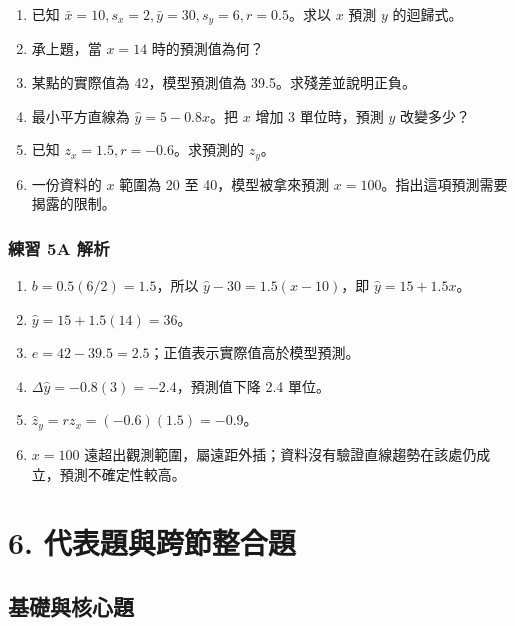 \documentclass[11pt,a4paper]{article}
\providecommand{\tightlist}{%
  \setlength{\itemsep}{0pt}\setlength{\parskip}{0pt}}
\begin{document}
\begin{enumerate}
\def\labelenumi{\arabic{enumi}.}
\tightlist
\item
  已知 \(\bar x=10,s_x=2,\bar y=30,s_y=6,r=0.5\)。求以 \(x\) 預測 \(y\) 的迴歸式。
\item
  承上題，當 \(x=14\) 時的預測值為何？
\item
  某點的實際值為 42，模型預測值為 39.5。求殘差並說明正負。
\item
  最小平方直線為 \(\hat y=5-0.8x\)。把 \(x\) 增加 3 單位時，預測 \(y\) 改變多少？
\item
  已知 \(z_x=1.5,r=-0.6\)。求預測的 \(z_y\)。
\item
  一份資料的 \(x\) 範圍為 20 至 40，模型被拿來預測 \(x=100\)。指出這項預測需要揭露的限制。
\end{enumerate}

\subsubsection{練習 5A 解析}\label{ux7df4ux7fd2-5a-ux89e3ux6790}

\begin{enumerate}
\def\labelenumi{\arabic{enumi}.}
\tightlist
\item
  \(b=0.5(6/2)=1.5\)，所以 \(\hat y-30=1.5(x-10)\)，即 \(\boxed{\hat y=15+1.5x}\)。
\item
  \(\hat y=15+1.5(14)=\boxed{36}\)。
\item
  \(e=42-39.5=\boxed{2.5}\)；正值表示實際值高於模型預測。
\item
  \(\Delta\hat y=-0.8(3)=\boxed{-2.4}\)，預測值下降 2.4 單位。
\item
  \(\hat z_y=rz_x=(-0.6)(1.5)=\boxed{-0.9}\)。
\item
  \(x=100\) 遠超出觀測範圍，屬遠距外插；資料沒有驗證直線趨勢在該處仍成立，預測不確定性較高。
\end{enumerate}

\section{6. 代表題與跨節整合題}\label{ux4ee3ux8868ux984cux8207ux8de8ux7bc0ux6574ux5408ux984c}

\subsection{基礎與核心題}\label{ux57faux790eux8207ux6838ux5fc3ux984c}
\end{document}
